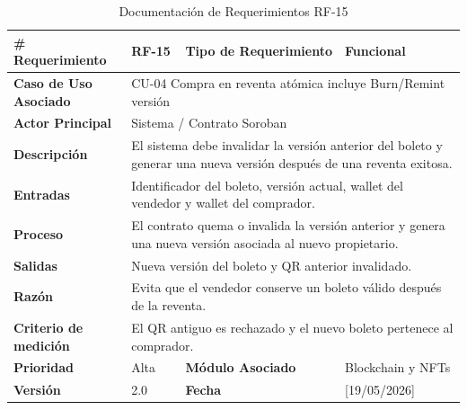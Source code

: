 \documentclass[12pt,letterpaper]{article}
\begin{document}
\begin{table}[H]
\centering
\scriptsize
\renewcommand{\arraystretch}{1.05}
\setlength{\tabcolsep}{3pt}

\newlength{\anchoceldaRFquince}
\setlength{\anchoceldaRFquince}{\dimexpr\textwidth-2.7cm-8\tabcolsep-5\arrayrulewidth\relax}

\begin{tabularx}{\textwidth}{|p{2.7cm}|X|p{2.8cm}|X|}
\hline
\textbf{\# Requerimiento} & RF-15 & \textbf{Tipo de Requerimiento} & Funcional \\ \hline

\textbf{Caso de Uso Asociado} & 
\multicolumn{3}{p{\anchoceldaRFquince}|}{CU-04 Compra en reventa atómica incluye Burn/Remint versión} \\ \hline

\textbf{Actor Principal} & 
\multicolumn{3}{p{\anchoceldaRFquince}|}{Sistema / Contrato Soroban} \\ \hline

\textbf{Descripción} & 
\multicolumn{3}{p{\anchoceldaRFquince}|}{El sistema debe invalidar la versión anterior del boleto y generar una nueva versión después de una reventa exitosa.} \\ \hline

\textbf{Entradas} & 
\multicolumn{3}{p{\anchoceldaRFquince}|}{Identificador del boleto, versión actual, wallet del vendedor y wallet del comprador.} \\ \hline

\textbf{Proceso} & 
\multicolumn{3}{p{\anchoceldaRFquince}|}{El contrato quema o invalida la versión anterior y genera una nueva versión asociada al nuevo propietario.} \\ \hline

\textbf{Salidas} & 
\multicolumn{3}{p{\anchoceldaRFquince}|}{Nueva versión del boleto y QR anterior invalidado.} \\ \hline

\textbf{Razón} & 
\multicolumn{3}{p{\anchoceldaRFquince}|}{Evita que el vendedor conserve un boleto válido después de la reventa.} \\ \hline

\textbf{Criterio de medición} & 
\multicolumn{3}{p{\anchoceldaRFquince}|}{El QR antiguo es rechazado y el nuevo boleto pertenece al comprador.} \\ \hline

\textbf{Prioridad} & Alta & \textbf{Módulo Asociado} & Blockchain y NFTs \\ \hline

\textbf{Versión} & 2.0 & \textbf{Fecha} & [19/05/2026] \\ \hline

\end{tabularx}

\caption{Documentación de Requerimientos RF-15}
\label{tab:documentacion_requerimientos_rf15}
\normalsize
\end{table}
\end{document}
